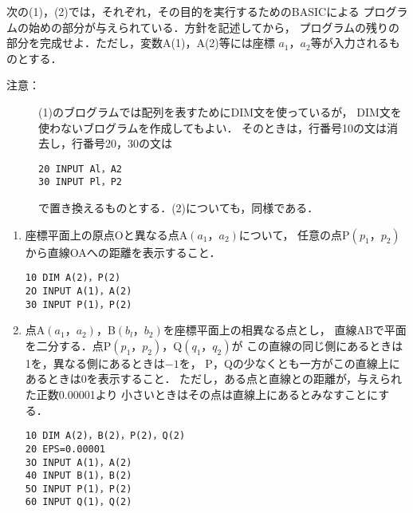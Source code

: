 \documentclass[fleqn]{jarticle}
\begin{document}
次の(1)，(2)では，それぞれ，その目的を実行するためのBASICによる
プログラムの始めの部分が与えられている．方針を記述してから，
プログラムの残りの部分を完成せよ．ただし，変数A(1)，A(2)等には座標
$a_1$，$a_2$等が入力されるものとする．

\begin{description}
\item[注意：] (1)のブログラムでは配列を表すためにDIM文を使っているが，
  DIM文を使わないブログラムを作成してもよい．
  そのときは，行番号10の文は消去し，行番号20，30の文は
    \begin{jquote}
    \begin{verbatim}
20 INPUT Al，A2
30 INPUT Pl，P2
    \end{verbatim}
    \end{jquote}
で置き換えるものとする．(2)についても，同様である．
\end{description}
\begin{enumerate}[(1)]
  \item 座標平面上の原点Oと異なる点A$(a_1，a_2)$について，
    任意の点P$(p_1，p_2)$から直線OAへの距離を表示すること．
    \begin{jquote}
    \begin{verbatim}
10 DIM A(2)，P(2)
2O INPUT A(1)，A(2)
30 INPUT P(1)，P(2)
    \end{verbatim}
    \end{jquote}
  \item 点A$(a_1，a_2)$，B$(b_l，b_2)$を座標平面上の相異なる点とし，
    直線ABで平面を二分する．点P$(p_1，p_2)$，Q$(q_1，q_2)$が
    この直線の同じ側にあるときは1を，異なる側にあるときは$-1$を，
    P，Qの少なくとも一方がこの直線上にあるときは0を表示すること．
    ただし，ある点と直線との距離が，与えられた正数0.00001より
    小さいときはその点は直線上にあるとみなすことにする．
    \begin{jquote}
    \begin{verbatim}
10 DIM A(2)，B(2)，P(2)，Q(2)
20 EPS=0.00001
3O INPUT A(1)，A(2)
40 INPUT B(1)，B(2)
5O INPUT P(1)，P(2)
60 INPUT Q(1)，Q(2)
    \end{verbatim}
    \end{jquote}
\end{enumerate}
\end{document}
